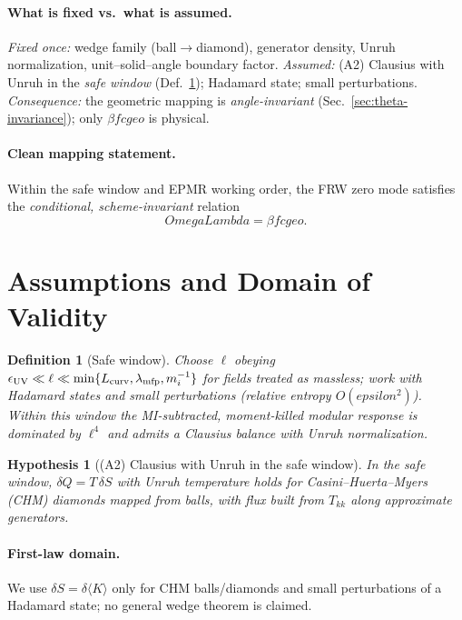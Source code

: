 \documentclass[aps,prd,onecolumn,superscriptaddress,nofootinbib]{revtex4-2}
\def\OmL{OmegaLambda}%
\def\cgeo{cgeo}%
\def\eps{epsilon}%
\newcommand{\OmL}{\Omega_\Lambda}
\newcommand{\cgeo}{c_{\rm geo}}
\newcommand{\eps}{\varepsilon}
\newtheorem{definition}{Definition}
\newtheorem{hypothesis}{Hypothesis}
\begin{document}
\paragraph{What is fixed vs.\ what is assumed.}
\emph{Fixed once:} wedge family (ball$\to$diamond), generator density, Unruh normalization, unit--solid--angle boundary factor. \emph{Assumed:} (A2) Clausius with Unruh in the \emph{safe window} (Def.\ \ref{def:safe-window}); Hadamard state; small perturbations. \emph{Consequence:} the geometric mapping is \emph{angle-invariant} (Sec.\ \ref{sec:theta-invariance}); only $\beta f \cgeo$ is physical.

\paragraph{Clean mapping statement.}
Within the safe window and EPMR working order, the FRW zero mode satisfies the \emph{conditional, scheme-invariant} relation
\begin{equation}
\label{eq:OmegaL-clean}
\OmL=\beta f \cgeo.
\end{equation}

\section{Assumptions and Domain of Validity}
\label{sec:assumptions}

\begin{definition}[Safe window]
\label{def:safe-window}
Choose $\ell$ obeying $\epsilon_{\rm UV}\ll \ell \ll \min\{L_{\rm curv},\lambda_{\rm mfp},m_i^{-1}\}$ for fields treated as massless; work with Hadamard states and small perturbations (relative entropy $O(\eps^2)$). Within this window the MI-subtracted, moment-killed modular response is dominated by $\ell^4$ and admits a Clausius balance with Unruh normalization.
\end{definition}

\begin{hypothesis}[(A2) Clausius with Unruh in the safe window]
\label{hyp:A2}
In the safe window, $\delta Q=T\,\delta S$ with Unruh temperature holds for \emph{Casini--Huerta--Myers (CHM)} diamonds mapped from balls, with flux built from $T_{kk}$ along approximate generators.
\end{hypothesis}

\paragraph{First-law domain.} We use $\delta S=\delta\langle K\rangle$ only for CHM balls/diamonds and small perturbations of a Hadamard state; no general wedge theorem is claimed.
\end{document}
